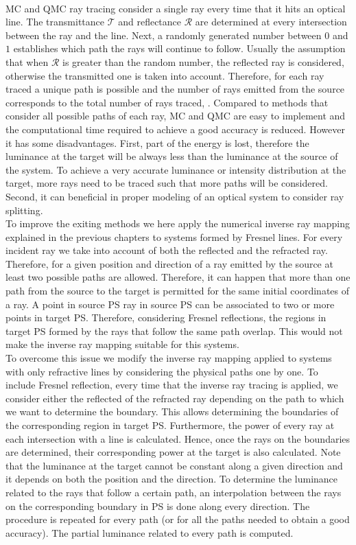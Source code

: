 \\ \indent
MC and QMC ray tracing consider a single ray every time that it hits an optical line. The transmittance $\mathcal{T}$ and reflectance $\mathcal{R}$ are determined at every intersection between the ray and the line. Next, a randomly generated number between $0$ and $1$ establishes which path the rays will continue to follow. Usually the assumption that when $\mathcal{R}$ is greater than the random number, the reflected ray is considered, otherwise the transmitted one is taken into account. Therefore, for each ray traced a unique path is possible and the number of rays emitted from the source corresponds to the total number of rays traced, \cite{koshel2012illumination}. Compared to methods that consider all possible paths of each ray, MC and QMC are easy to implement and the computational time required to achieve a good accuracy is reduced. However it has some disadvantages. First, part of the energy is lost, therefore the luminance at the target will be always less than the luminance at the source of the system. To achieve a very accurate luminance or intensity distribution at the target, more rays need to be traced such that more paths will be considered.
Second, it can beneficial in proper modeling of an optical system to consider ray splitting.
\\ \indent 
To improve the exiting methods we here apply the numerical inverse ray mapping explained in the previous chapters to systems formed by Fresnel lines. For every incident ray we take into account of both the reflected and the refracted ray. Therefore, for a given position and direction of a ray emitted by the source at least two possible paths are allowed. Therefore, it can happen that more than one path from the source to the target is permitted for the same initial coordinates of a ray. A point in source PS ray in source PS can be associated to two or more points in target PS. Therefore, considering Fresnel reflections, the regions in target PS formed by the rays that follow the same path overlap. This would not make the inverse ray mapping suitable for this systems.
\\ \indent To overcome this issue we modify the inverse ray mapping applied to systems with only refractive lines by considering the physical paths one by one. To include Fresnel reflection, every time that the inverse ray tracing is applied, we consider either the reflected of the refracted ray depending on the path to which we want to determine the boundary. This allows determining the boundaries of the corresponding region in target PS. Furthermore, the power of every ray at each intersection with a line is calculated. Hence, once the rays on the boundaries are determined, their corresponding power at the target is also calculated. Note that the luminance at the target cannot be constant along a given direction and it depends on both the position and the direction. To determine the luminance related to the rays that follow a certain path, an interpolation between the rays on the corresponding boundary in PS is done along every direction. The procedure is repeated for every path (or for all the paths needed to obtain a good accuracy). The partial luminance related to every path is computed.
